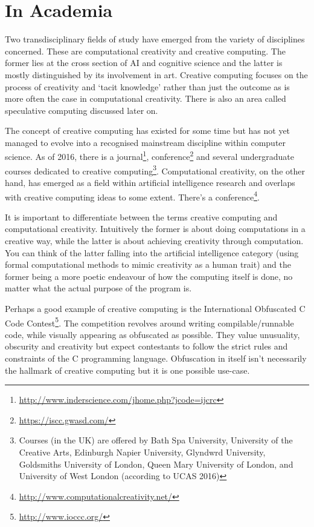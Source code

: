\section{In Academia}

Two transdisciplinary fields of study have emerged from the variety of disciplines concerned. These are computational creativity and creative computing. The former lies at the cross section of \ac{AI} and cognitive science and the latter is mostly distinguished by its involvement in art. Creative computing focuses on the process of creativity and `tacit knowledge' rather than just the outcome as is more often the case in computational creativity. There is also an area called speculative computing discussed later on.

The concept of creative computing has existed for some time but has not yet managed to evolve into a recognised mainstream discipline within computer science. As of 2016, there is a journal\footnote{\url{http://www.inderscience.com/jhome.php?jcode=ijcrc}}, conference\footnote{\url{https://iscc.gwasd.com/}} and several undergraduate courses dedicated to creative computing\footnote{Courses (in the UK) are offered by Bath Spa University, University of the Creative Arts, Edinburgh Napier University, Glyndwrd University, Goldsmiths University of London, Queen Mary University of London, and University of West London (according to UCAS 2016)}. Computational creativity, on the other hand, has emerged as a field within artificial intelligence research and overlaps with creative computing ideas to some extent. There's a conference\footnote{\url{http://www.computationalcreativity.net/}}.

It is important to differentiate between the terms creative computing and computational creativity. Intuitively the former is about doing computations in a creative way, while the latter is about achieving creativity through computation. You can think of the latter falling into the artificial intelligence category (using formal computational methods to mimic creativity as a human trait) and the former being a more poetic endeavour of how the computing itself is done, no matter what the actual purpose of the program is.

Perhaps a good example of creative computing is the International Obfuscated C Code Contest\footnote{\url{http://www.ioccc.org/}}. The competition revolves around writing compilable/runnable code, while visually appearing as obfuscated as possible. They value unusuality, obscurity and creativity but expect contestants to follow the strict rules and constraints of the C programming language. Obfuscation in itself isn't necessarily the hallmark of creative computing but it is one possible use-case.

